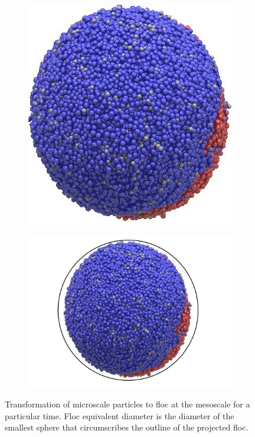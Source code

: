 \begin{figure}[!ht]
\begin{subfigure}[b]{.5\textwidth}
\includegraphics[width=1\textwidth]{result2/diag1b}
\label{}
\end{subfigure}\hspace*{-.5em}
\begin{subfigure}[b]{.75\textwidth}
\includegraphics[width=1.02\textwidth]{result2/diag1bb}
\end{subfigure}%
\caption{Transformation of microscale particles to floc at the mesoscale for a particular time. Floc equivalent diameter is the diameter of the smallest sphere that circumscribes the outline of the projected floc.}\label{diag2}
\end{figure}

